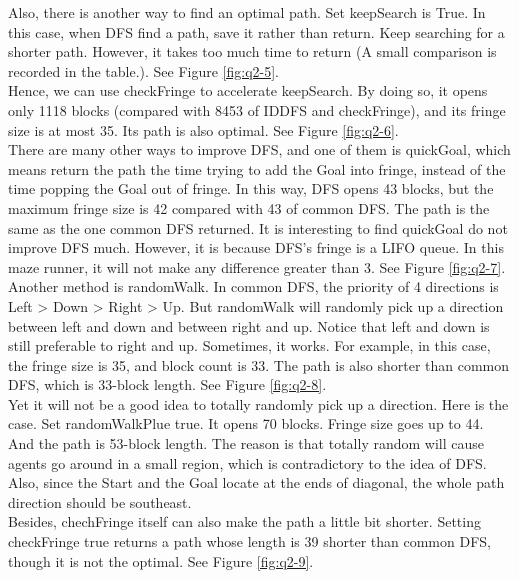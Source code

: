 \documentclass[letter]{article}
\begin{document}
\begin{questions}
	Also, there is another way to find an optimal path. Set keepSearch is True. In this case, when DFS find a path, save it rather than return. Keep searching for a shorter path. However, it takes too much time to return (A small comparison is recorded in the table.). See Figure \ref{fig:q2-5}. \\
	
	Hence, we can use checkFringe to accelerate keepSearch. By doing so, it opens only 1118 blocks (compared with 8453 of IDDFS and checkFringe), and its fringe size is at most 35. Its path is also optimal. See Figure \ref{fig:q2-6}. \\
	
	There are many other ways to improve DFS, and one of them is quickGoal, which means return the path the time trying to add the Goal into fringe, instead of the time popping the Goal out of fringe. In this way, DFS opens 43 blocks, but the maximum fringe size is 42 compared with 43 of common DFS. The path is the same as the one common DFS returned. It is interesting to find quickGoal do not improve DFS much. However, it is because DFS’s fringe is a LIFO queue. In this maze runner, it will not make any difference greater than 3. See Figure \ref{fig:q2-7}. \\
	
	Another method is randomWalk. In common DFS, the priority of 4 directions is Left > Down > Right > Up. But randomWalk will randomly pick up a direction between left and down and between right and up. Notice that left and down is still preferable to right and up. Sometimes, it works. For example, in this case, the fringe size is 35, and block count is 33. The path is also shorter than common DFS, which is 33-block length. See Figure \ref{fig:q2-8}. \\
	
	Yet it will not be a good idea to totally randomly pick up a direction. Here is the case. Set randomWalkPlue true. It opens 70 blocks. Fringe size goes up to 44. And the path is 53-block length. The reason is that totally random will cause agents go around in a small region, which is contradictory to the idea of DFS. Also, since the Start and the Goal locate at the ends of diagonal, the whole path direction should be southeast. \\
	
	Besides, chechFringe itself can also make the path a little bit shorter. Setting checkFringe true returns a path whose length is 39 shorter than common DFS, though it is not the optimal. See Figure \ref{fig:q2-9}. \\
	

\end{questions}
\end{document}
